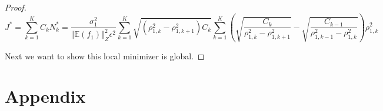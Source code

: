 \documentclass[final,3p,times,11pt]{elsarticle}
\begin{document}
\begin{proof}
\begin{equation}\label{eq:MFMC_sampling_cost}
    J^* = \sum_{k=1}^K C_kN_k^* = \frac{\sigma_1^2}{\left\Vert\mathbb{E}(f_1) \right\Vert_{Z}^2\epsilon^2}\sum_{k=1}^K\sqrt{\left(\rho_{1,k}^2 - \rho_{1,k+1}^2\right)C_k}\sum_{k=1}^K\left(\sqrt{\frac{C_k}{\rho_{1,k}^2 - \rho_{1,k+1}^2}} - \sqrt{\frac{C_{k-1}}{\rho_{1,{k-1}}^2 - \rho_{1,k}^2}}\right)\rho_{1,k}^2
\end{equation}

Next we want to show this local minimizer is global.



\end{proof}





\section{Appendix}\label{sec:Appendix}





\end{document}
